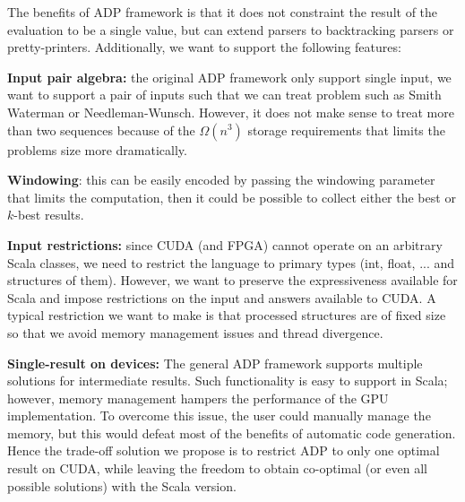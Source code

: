The benefits of ADP framework is that it does not constraint the result of the evaluation to be a single value, but can extend parsers to backtracking parsers or pretty-printers. Additionally, we want to support the following features:\ol
\item \textbf{Input pair algebra:} the original ADP framework only support single input, we want to support a pair of inputs such that we can treat problem such as Smith Waterman or Needleman-Wunsch. However, it does not make sense to treat more than two sequences because of the $\Omega(n^3)$ storage requirements that limits the problems size more dramatically.
\item \textbf{Windowing}: this can be easily encoded by passing the windowing parameter that limits the computation, then it could be possible to collect either the best or $k$-best results.
\item \textbf{Input restrictions:} since CUDA (and FPGA) cannot operate on an arbitrary Scala classes, we need to restrict the language to primary types (int, float, ... and structures of them). However, we want to preserve the expressiveness available for Scala and impose restrictions on the input and answers available to CUDA. A typical restriction we want to make is that processed structures are of fixed size so that we avoid memory management issues and thread divergence.
\item \textbf{Single-result on devices:} The general ADP framework supports multiple solutions for intermediate results. Such functionality is easy to support in Scala; however, memory management hampers the performance of the GPU implementation. To overcome this issue, the user could manually manage the memory, but this would defeat most of the benefits of automatic code generation. Hence the trade-off solution we propose is to restrict ADP to only one optimal result on CUDA, while leaving the freedom to obtain co-optimal (or even all possible solutions) with the Scala version.


